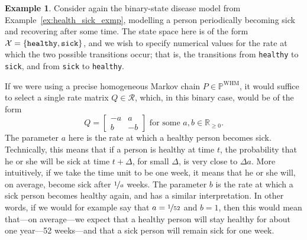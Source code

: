 \documentclass[10pt,a4paper]{paper}
\theoremstyle{definition}
\newtheorem{exmp}{Example}
\newcommand{\reals}{\mathbb{R}}
\newcommand{\states}{\mathcal{X}}
\newcommand{\processes}{\mathbb{P}}
\newcommand{\whmprocesses}{\processes^{\mathrm{WHM}}}
\begin{document}
\begin{exmp}\label{exmp:example_rateset_simple_model}
Consider again the binary-state disease model from Example~\ref{ex:health_sick_exmp}, modelling a person periodically becoming sick and recovering after some time. The state space here is of the form $\states=\{\text{{\tt healthy}},\text{{\tt sick}}\}$, and we wish to specify numerical values for the rate at which the two possible transitions occur; that is, the transitions from {\tt healthy} to {\tt sick}, and from {\tt sick} to {\tt healthy}.

If we were using a precise homogeneous Markov chain $P\in\whmprocesses$, it would suffice to select a single rate matrix $Q\in\mathcal{R}$, which, in this binary case, would be of the form
\begin{equation*}
Q = \left[ \begin{array}{rr}
-a & a \\
b & -b
\end{array}\right] \text{ for some } a,b\in\reals_{\geq0}.
\end{equation*}
The parameter $a$ here is the rate at which a healthy person becomes sick.
Technically, this means that if a person is healthy at time $t$, the probability that he or she will be sick at time $t+\Delta$, for small $\Delta$, is very close to $\Delta a$. More intuitively, if we take the time unit to be one week, it means that he or she will, on average, become sick after $\nicefrac{1}{a}$ weeks. The parameter $b$ is the rate at which a sick person becomes healthy again, and has a similar interpretation. In other words, if we would for example say that $a=\nicefrac{1}{52}$ and $b=1$, then this would mean that---on average---we expect that a healthy person will stay healthy for about one year---52 weeks---and that a sick person will remain sick for one week.



\end{exmp}
\end{document}
